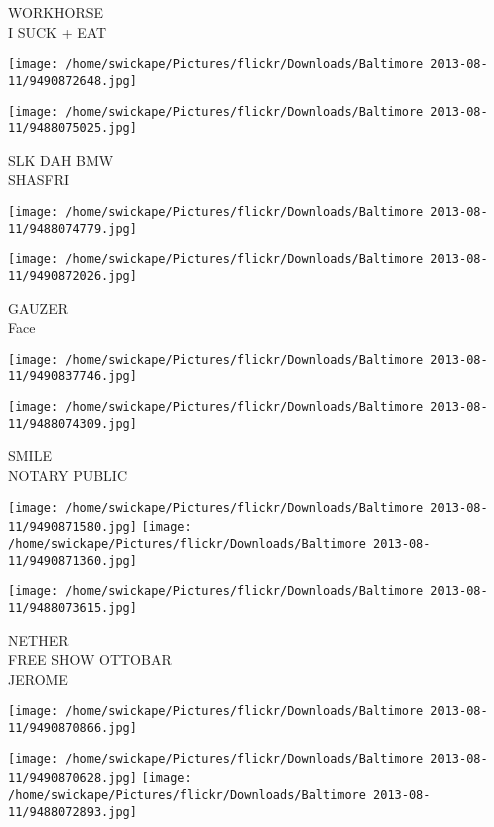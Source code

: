 \documentclass[10pt,letterpaper]{article}
\begin{document}
WORKHORSE\\
I SUCK + EAT
\pagebreak

\texttt{[image: /home/swickape/Pictures/flickr/Downloads/Baltimore 2013-08-11/9490872648.jpg]}

\vspace{0.25in}
\texttt{[image: /home/swickape/Pictures/flickr/Downloads/Baltimore 2013-08-11/9488075025.jpg]}

SLK DAH BMW\\
SHASFRI
\pagebreak

\texttt{[image: /home/swickape/Pictures/flickr/Downloads/Baltimore 2013-08-11/9488074779.jpg]}

\vspace{0.25in}
\texttt{[image: /home/swickape/Pictures/flickr/Downloads/Baltimore 2013-08-11/9490872026.jpg]}

GAUZER\\
Face
\pagebreak

\texttt{[image: /home/swickape/Pictures/flickr/Downloads/Baltimore 2013-08-11/9490837746.jpg]}

\vspace{0.25in}
\texttt{[image: /home/swickape/Pictures/flickr/Downloads/Baltimore 2013-08-11/9488074309.jpg]}

SMILE\\
NOTARY PUBLIC
\pagebreak

\texttt{[image: /home/swickape/Pictures/flickr/Downloads/Baltimore 2013-08-11/9490871580.jpg]}
\texttt{[image: /home/swickape/Pictures/flickr/Downloads/Baltimore 2013-08-11/9490871360.jpg]}

\vspace{0.25in}
\texttt{[image: /home/swickape/Pictures/flickr/Downloads/Baltimore 2013-08-11/9488073615.jpg]}

NETHER\\
FREE SHOW OTTOBAR\\
JEROME
\pagebreak

\texttt{[image: /home/swickape/Pictures/flickr/Downloads/Baltimore 2013-08-11/9490870866.jpg]}

\vspace{0.25in}
\texttt{[image: /home/swickape/Pictures/flickr/Downloads/Baltimore 2013-08-11/9490870628.jpg]}
\texttt{[image: /home/swickape/Pictures/flickr/Downloads/Baltimore 2013-08-11/9488072893.jpg]}
\end{document}
